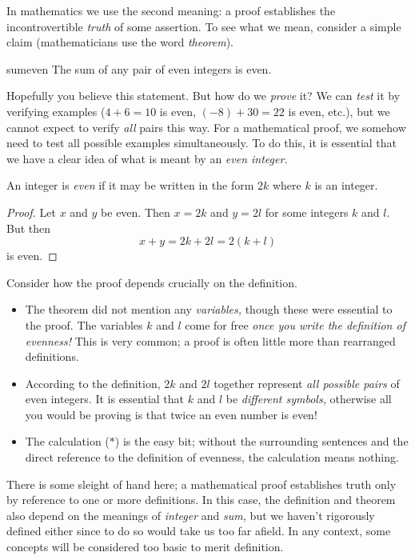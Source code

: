 In mathematics we use the second meaning: a proof establishes the incontrovertible \emph{truth} of some assertion. To see what we mean, consider a simple claim (mathematicians use the word \emph{theorem}).

\begin{thm}{}{sumeven}
	The sum of any pair of even integers is even.
\end{thm}

Hopefully you believe this statement. But how do we \emph{prove} it? We can \emph{test} it by verifying examples ($4+6=10$ is even, $(-8)+30=22$ is even, etc.), but we cannot expect to verify \emph{all} pairs this way. For a mathematical proof, we somehow need to test all possible examples simultaneously. To do this, it is essential that we have a clear idea of what is meant by an \emph{even integer.}

\begin{defn}{}{}
	An integer is \emph{even} if it may be written in the form $2k$ where $k$ is an integer.
\end{defn}

\begin{proof}
	Let $x$ and $y$ be even. Then $x=2k$ and $y=2l$ for some integers $k$ and $l$. But then
	\[x+y=2k+2l=2(k+l)\tag{$\ast$}\]
	is even.
\end{proof}

Consider how the proof depends crucially on the definition.

\begin{itemize}%
	\item The theorem did not mention any \emph{variables,} though these were essential to the proof. The variables $k$ and $l$ come for free \emph{once you write the definition of evenness!} This is very common; a proof is often little more than rearranged definitions.
	\item According to the definition, $2k$ and $2l$ together represent \emph{all possible pairs} of even integers. It is essential that $k$ and $l$ be \emph{different symbols,} otherwise all you would be proving is that twice an even number is even!
	\item The calculation ($\ast$) is the easy bit; without the surrounding sentences and the direct reference to the definition of evenness, the calculation means nothing.
\end{itemize}

There is some sleight of hand here; a mathematical proof establishes truth only by reference to one or more definitions. In this case, the definition and theorem also depend on the meanings of \emph{integer} and \emph{sum,} but we haven't rigorously defined either since to do so would take us too far afield. In any context, some concepts will be considered too basic to merit definition.

